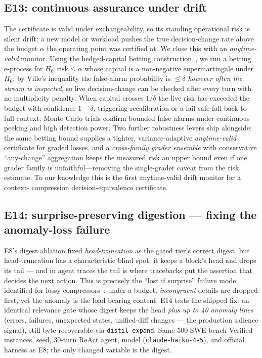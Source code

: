 \documentclass[11pt]{article}
\begin{document}
\subsection{E13: continuous assurance under drift}
\label{sec:e13}

The certificate is valid under exchangeability, so its standing operational risk is silent
drift: a new model or workload pushes the true decision-change rate above the budget $\alpha$
the operating point was certified at. We close this with an \emph{anytime-valid} monitor. Using
the hedged-capital betting construction~\cite{wsr}, we run a betting
e-process for $H_0\!:\text{risk}\le\alpha$ whose capital is a non-negative supermartingale under
$H_0$; by Ville's inequality the false-alarm probability is $\le\delta$ \emph{however often the
stream is inspected}, so live decision-change can be checked after every turn with no
multiplicity penalty. When capital crosses $1/\delta$ the live risk has exceeded the budget with
confidence $1-\delta$, triggering recalibration or a fail-safe fall-back to full context;
Monte-Carlo trials confirm bounded false alarms under continuous peeking and high detection
power. Two further robustness levers ship alongside: the same betting bound supplies a tighter,
variance-adaptive \emph{anytime-valid} certificate for graded losses, and a \emph{cross-family
grader ensemble} with conservative ``any-change'' aggregation keeps the measured risk an
upper bound even if one grader family is unfaithful---removing the single-grader caveat from the
risk estimate. To our knowledge this is the first anytime-valid drift monitor for a context-
compression decision-equivalence certificate.

\subsection{E14: surprise-preserving digestion --- fixing the anomaly-loss failure}
\label{sec:e14}

E8's digest ablation fixed \emph{head-truncation} as the gated tier's correct digest, but
head-truncation has a characteristic blind spot: it keeps a block's head and drops its tail
--- and in agent traces the tail is where tracebacks put the assertion that decides the next
action. This is precisely the ``lost if surprise'' failure mode identified for lossy
compressors~\cite{silverbullet}: under a budget, \emph{incongruent} details are dropped
first, yet the anomaly is the load-bearing content. E14 tests the shipped fix: an identical
relevance gate whose digest keeps the head \emph{plus up to 40 anomaly lines} (errors,
failures, unexpected states, unified-diff changes --- the production salience signal), still
byte-recoverable via \texttt{distil\_expand}. Same 500 SWE-bench Verified instances, seed,
30-turn ReAct agent, model (\texttt{claude-haiku-4-5}), and official harness as E8; the only
changed variable is the digest.
\end{document}
